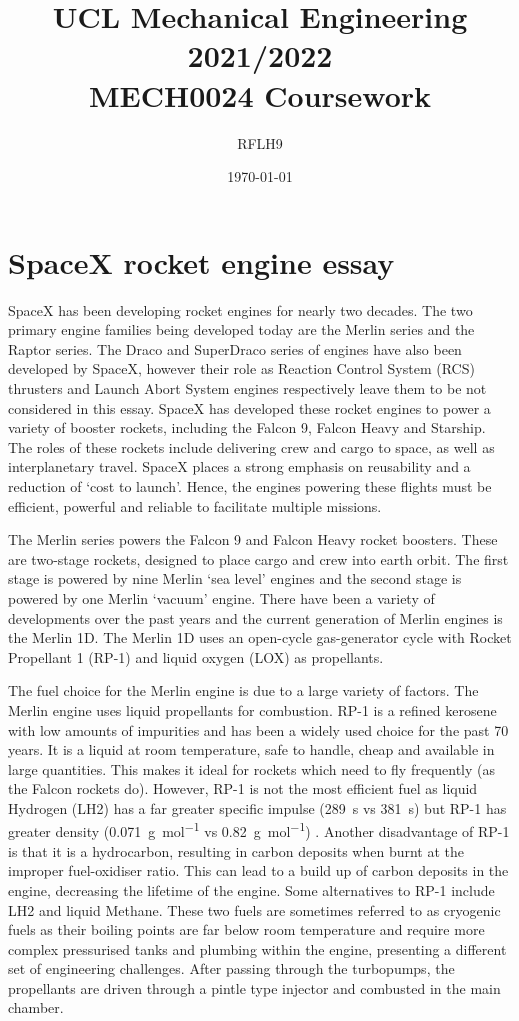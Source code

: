\documentclass[11pt]{article}
\numberwithin{equation}{section}
\begin{document}
\title{\textbf{UCL Mechanical Engineering 2021/2022}\\MECH0024 Coursework}
\author{RFLH9}
\date{\today}
\maketitle
\tableofcontents
\listoffigures
\listoftables
\newpage
\part{SpaceX rocket engine essay}
SpaceX has been developing rocket engines for nearly two decades. The two primary engine families being developed today are the Merlin series and the Raptor series. The Draco and SuperDraco series of engines have also been developed by SpaceX, however their role as Reaction Control System (RCS) thrusters and Launch Abort System engines respectively leave them to be not considered in this essay. SpaceX has developed these rocket engines to power a variety of booster rockets, including the Falcon 9, Falcon Heavy and Starship. The roles of these rockets include delivering crew and cargo to space, as well as interplanetary travel. SpaceX places a strong emphasis on reusability and a reduction of `cost to launch'. Hence, the engines powering these flights must be efficient, powerful and reliable to facilitate multiple missions.

The Merlin series powers the Falcon 9 and Falcon Heavy rocket boosters. These are two-stage rockets, designed to place cargo and crew into earth orbit. The first stage is powered by nine Merlin `sea level' engines and the second stage is powered by one Merlin `vacuum' engine. There have been a variety of developments over the past years and the current generation of Merlin engines is the Merlin 1D. The Merlin 1D uses an open-cycle gas-generator cycle with Rocket Propellant 1 (RP-1) and liquid oxygen (LOX) as propellants.

The fuel choice for the Merlin engine is due to a large variety of factors. The Merlin engine uses liquid propellants for combustion. RP-1 is a refined kerosene with low amounts of impurities and has been a widely used choice for the past 70 years. It is a liquid at room temperature, safe to handle, cheap and available in large quantities. This makes it ideal for rockets which need to fly frequently (as the Falcon rockets do). However, RP-1 is not the most efficient fuel as liquid Hydrogen (LH2) has a far greater specific impulse (\SI{289}{\second} vs \SI{381}{\second}) but RP-1 has greater density (\SI{0.071}{\gram\per\mol} vs \SI{0.82}{\gram\per\mol}) \cite{b1}. Another disadvantage of RP-1 is that it is a hydrocarbon, resulting in carbon deposits when burnt at the improper fuel-oxidiser ratio. This can lead to a build up of carbon deposits in the engine, decreasing the lifetime of the engine. Some alternatives to RP-1 include LH2 and liquid Methane. These two fuels are sometimes referred to as cryogenic fuels as their boiling points are far below room temperature and require more complex pressurised tanks and plumbing within the engine, presenting a different set of engineering challenges. After passing through the turbopumps, the propellants are driven through a pintle type injector and combusted in the main chamber.
\end{document}
